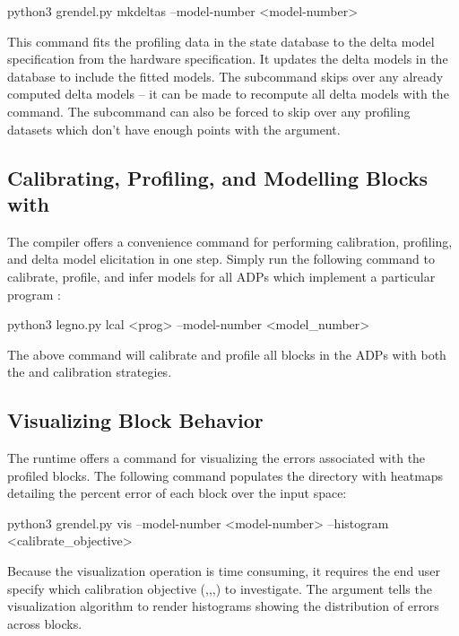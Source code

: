 \begin{snippet}
python3 grendel.py mkdeltas --model-number <model-number>
\end{snippet}

This command fits the profiling data in the state database to the delta model
specification from the hardware specification. It updates the delta models in
the database to include the fitted models. The  subcommand skips
over any already computed delta models -- it can be made to recompute all delta
models with the  command. The  subcommand can also be
forced to skip over any profiling datasets which don't have enough points with
the  argument. 

\subsection{Calibrating, Profiling, and Modelling Blocks with }

The \legno compiler offers a convenience command for performing calibration,
profiling, and delta model elicitation in one step. Simply run the following
command to calibrate, profile, and infer models for all ADPs which
implement a particular program :

\begin{snippet}
python3 legno.py lcal <prog> --model-number <model_number>
\end{snippet}

The above command will calibrate and profile all blocks in the ADPs with both
the  and  calibration strategies.

\subsection{Visualizing Block Behavior}

The \grendel runtime offers a command for visualizing the errors associated with
the profiled blocks. The following command populates the
 directory with heatmaps detailing
the percent error of each block over the input space:

\begin{snippet}
python3 grendel.py vis --model-number <model-number> --histogram <calibrate_objective>
\end{snippet}

Because the visualization operation is time consuming, it requires the end user
specify which calibration objective
(,,,) to investigate. The
 argument tells the visualization algorithm to render histograms
showing the distribution of errors across blocks. 

